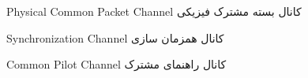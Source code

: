 	
%
%
%
%
%
%
%
%
%
%
%
%
%
%
%
%
%
%
%
%
%	
%
%
%


{Physical Common Packet Channel} 
{کانال بسته مشترک فیزیکی}{}





%
%
%
%
%
%
%



{Synchronization Channel} 
{کانال همزمان سازی}{}


%
%
%
%
%
%
%
%
%
%


{Common Pilot Channel} 
{کانال راهنمای مشترک}{}




